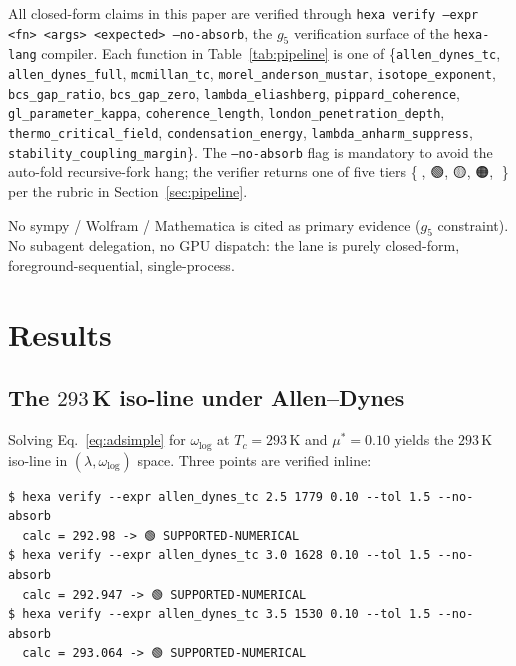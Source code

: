 \documentclass[11pt,a4paper]{article}
\providecommand{\tierBlue}{🔵}
\providecommand{\tierGreen}{🟢}
\providecommand{\tierYellow}{🟡}
\providecommand{\tierOrange}{🟠}
\providecommand{\tierRed}{🔴}
\begin{document}
All closed-form claims in this paper are verified through
\texttt{hexa verify --expr <fn> <args> <expected> --no-absorb}, the
$g_5$ verification surface of the \texttt{hexa-lang} compiler. Each
function in Table~\ref{tab:pipeline} is one of
\{\texttt{allen\_dynes\_tc}, \texttt{allen\_dynes\_full},
\texttt{mcmillan\_tc}, \texttt{morel\_anderson\_mustar},
\texttt{isotope\_exponent}, \texttt{bcs\_gap\_ratio},
\texttt{bcs\_gap\_zero}, \texttt{lambda\_eliashberg},
\texttt{pippard\_coherence}, \texttt{gl\_parameter\_kappa},
\texttt{coherence\_length}, \texttt{london\_penetration\_depth},
\texttt{thermo\_critical\_field}, \texttt{condensation\_energy},
\texttt{lambda\_anharm\_suppress}, \texttt{stability\_coupling\_margin}\}.
The \texttt{--no-absorb} flag is mandatory to avoid the auto-fold
recursive-fork hang; the verifier returns one of five tiers
\{\tierBlue, \tierGreen, \tierYellow, \tierOrange, \tierRed\} per the
rubric in Section~\ref{sec:pipeline}.

No sympy / Wolfram / Mathematica is cited as primary evidence ($g_5$
constraint). No subagent delegation, no GPU dispatch: the lane is
purely closed-form, foreground-sequential, single-process.

\section{Results}
\label{sec:results}

\subsection{The $293$\,K iso-line under Allen--Dynes}
\label{sec:results-iso}

Solving Eq.~\ref{eq:adsimple} for $\omega_{\log}$ at $T_c=293$\,K and
$\mu^*=0.10$ yields the $293$\,K iso-line in $(\lambda,\omega_{\log})$
space. Three points are verified inline:

\begin{lstlisting}[basicstyle=\ttfamily\small,frame=single,xleftmargin=0pt]
$ hexa verify --expr allen_dynes_tc 2.5 1779 0.10 --tol 1.5 --no-absorb
  calc = 292.98 -> 🟢 SUPPORTED-NUMERICAL
$ hexa verify --expr allen_dynes_tc 3.0 1628 0.10 --tol 1.5 --no-absorb
  calc = 292.947 -> 🟢 SUPPORTED-NUMERICAL
$ hexa verify --expr allen_dynes_tc 3.5 1530 0.10 --tol 1.5 --no-absorb
  calc = 293.064 -> 🟢 SUPPORTED-NUMERICAL
\end{lstlisting}
\end{document}
